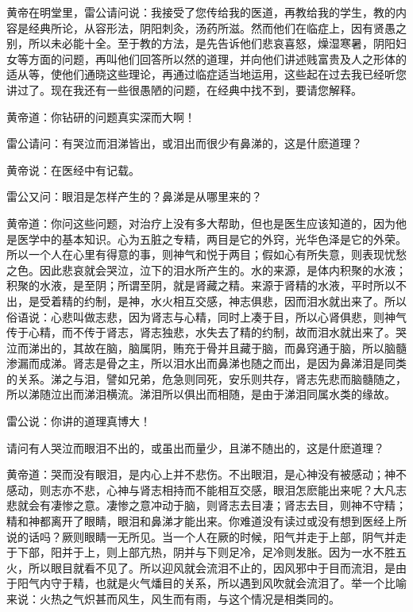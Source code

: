 \documentclass[12pt,UTF8]{ctexbook}
\begin{document}
黄帝在明堂里，雷公请问说：我接受了您传给我的医道，再教给我的学生，教的内容是经典所论，从容形法，阴阳刺灸，汤药所滋。然而他们在临症上，因有贤愚之别，所以未必能十全。至于教的方法，是先告诉他们悲哀喜怒，燥湿寒暑，阴阳妇女等方面的问题，再叫他们回答所以然的道理，并向他们讲述贱富贵及人之形体的适从等，使他们通晓这些理论，再通过临症适当地运用，这些起在过去我已经听您讲过了。现在我还有一些很愚陋的问题，在经典中找不到，要请您解释。

黄帝道：你钻研的问题真实深而大啊！

雷公请问：有哭泣而泪涕皆出，或泪出而很少有鼻涕的，这是什麽道理？

黄帝说：在医经中有记载。

雷公又问：眼泪是怎样产生的？鼻涕是从哪里来的？

黄帝道：你问这些问题，对治疗上没有多大帮助，但也是医生应该知道的，因为他是医学中的基本知识。心为五脏之专精，两目是它的外窍，光华色泽是它的外荣。所以一个人在心里有得意的事，则神气和悦于两目；假如心有所失意，则表现忧愁之色。因此悲哀就会哭泣，泣下的泪水所产生的。水的来源，是体内积聚的水液；积聚的水液，是至阴；所谓至阴，就是肾藏之精。来源于肾精的水液，平时所以不出，是受着精的约制，是神，水火相互交感，神志俱悲，因而泪水就出来了。所以俗语说：心悲叫做志悲，因为肾志与心精，同时上凑于目，所以心肾俱悲，则神气传于心精，而不传于肾志，肾志独悲，水失去了精的约制，故而泪水就出来了。哭泣而涕出的，其故在脑，脑属阴，贿充于骨并且藏于脑，而鼻窍通于脑，所以脑髓渗漏而成涕。肾志是骨之主，所以泪水出而鼻涕也随之而出，是因为鼻涕泪是同类的关系。涕之与泪，譬如兄弟，危急则同死，安乐则共存，肾志先悲而脑髓随之，所以涕随泣出而涕泪横流。涕泪所以俱出而相随，是由于涕泪同属水类的缘故。

雷公说：你讲的道理真博大！

请问有人哭泣而眼泪不出的，或虽出而量少，且涕不随出的，这是什麽道理？

黄帝道：哭而没有眼泪，是内心上并不悲伤。不出眼泪，是心神没有被感动；神不感动，则志亦不悲，心神与肾志相持而不能相互交感，眼泪怎麽能出来呢？大凡志悲就会有凄惨之意。凄惨之意冲动于脑，则肾志去目凄；肾志去目，则神不守精；精和神都离开了眼睛，眼泪和鼻涕才能出来。你难道没有读过或没有想到医经上所说的话吗？厥则眼睛一无所见。当一个人在厥的时候，阳气并走于上部，阴气并走于下部，阳并于上，则上部亢热，阴并与下则足冷，足冷则发胀。因为一水不胜五火，所以眼目就看不见了。所以迎风就会流泪不止的，因风邪中于目而流泪，是由于阳气内守于精，也就是火气燔目的关系，所以遇到风吹就会流泪了。举一个比喻来说：火热之气炽甚而风生，风生而有雨，与这个情况是相类同的。
\end{document}
